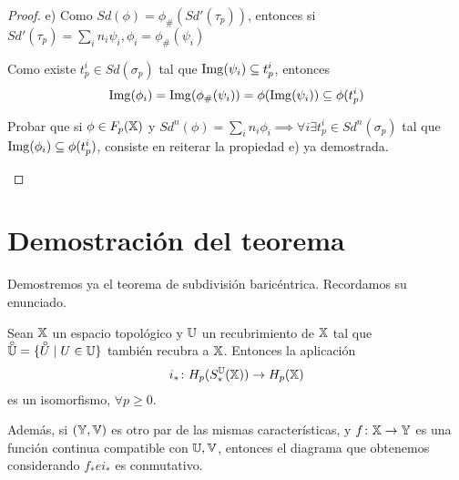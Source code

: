 \begin{proof}
  e) Como $Sd(\phi) = \phi_\#(Sd'(\tau_p))$, entonces si $Sd'(\tau_p) = \sum_i n_i \psi_i, \phi_i = \phi_\#(\psi_i)$

  Como existe $t_p^i \in Sd(\sigma_p)$ tal que $\operatorname{Img}(\psi_i) \subseteq t_p^i$, entonces
  \[\operatorname{Img}(\phi_i) = \operatorname{Img}(\phi_\#(\psi_i)) = \phi(\operatorname{Img}(\psi_i)) \subseteq \phi(t_p^i)\]

  \begin{remark}
    Probar que si $\phi \in F_p({\mathbb X})$ y $Sd^n(\phi) = \sum_i n_i \phi_i \implies \forall i \exists t_p^i \in Sd^n(\sigma_p)$ tal que
    $\operatorname{Img}(\phi_i) \subseteq \phi(t_p^i)$, consiste en reiterar la propiedad e) ya demostrada.
  \end{remark}

\end{proof}

\section{Demostración del teorema}

Demostremos ya el teorema de subdivisión baricéntrica. Recordamos su enunciado.

\begin{theorem}
  Sean ${\mathbb X}$ un espacio topológico y ${\mathbb U}$ un recubrimiento de ${\mathbb X}$ tal que $\interior{\U} = \{\interior{U} \mid U \in \U\}$
  también recubra a ${\mathbb X}$. Entonces la aplicación
  \[ i_* \colon H_p(S_*^{\mathbb U}({\mathbb X})) \to H_p({\mathbb X}) \]
  es un isomorfismo, $\forall p \geq 0$.

  Además, si $({\mathbb Y}, {\mathbb V})$ es otro par de las mismas características, y $f \colon {\mathbb X} \to {\mathbb Y}$ es una función continua
  compatible con ${\mathbb U}, {\mathbb V}$, entonces el diagrama que obtenemos considerando $f_* e i_*$ es conmutativo.
\end{theorem}

